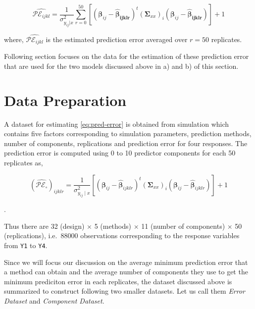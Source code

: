 \documentclass[12pt,3p,authoryear]{elsarticle}
\begin{document}
\begin{equation}
\widehat{\mathcal{PE}_{ijkl}} = \frac{1}{\sigma_{y_{ij}|x}^2}
  \sum_{r=0}^{50}{\left[\left(\boldsymbol{\beta}_{ij} - 
  \boldsymbol{\hat{\beta}_{ijklr}}\right)^t
  \left(\boldsymbol{\Sigma}_{xx}\right)_i
  \left(\boldsymbol{\beta}_{ij} - \boldsymbol{\hat{\beta}_{ijklr}}\right)\right]} + 1
\label{eq:estimated-pred-error}
\end{equation}

where, \(\widehat{\mathcal{PE}_{ijkl}}\) is the estimated prediction
error averaged over \(r=50\) replicates.

Following section focuses on the data for the estimation of these
prediction error that are used for the two models discussed above in a)
and b) of this section.

\section{Data Preparation}\label{data-preparation}

A dataset for estimating \eqref{eq:pred-error} is obtained from simulation
which contains five factors corresponding to simulation parameters,
prediction methods, number of components, replications and prediction
error for four responses. The prediction error is computed using 0 to 10
predictor components for each 50 replicates as,

\begin{equation*}
\left(\widehat{\mathcal{PE_\circ}}\right)_{ijklr} =
  \frac{1}{\sigma_{y_{ij}\mid x}^2}\left[
    \left(\boldsymbol{\beta}_{ij} - \hat{\boldsymbol{\beta}}_{ijklr}\right)^t
    \left(\boldsymbol{\Sigma}_{xx}\right)_{i}
    \left(\boldsymbol{\beta}_{ij} - \hat{\boldsymbol{\beta}}_{ijklr}\right)
  \right] + 1
\end{equation*}

.

Thus there are 32 (design) \(\times\) 5 (methods) \(\times\) 11 (number
of components) \(\times\) 50 (replications), i.e.~88000 observations
corresponding to the response variables from \texttt{Y1} to \texttt{Y4}.

Since we will focus our discussion on the average minimum prediction
error that a method can obtain and the average number of components they
use to get the minimum prediciton error in each replicates, the dataset
discussed above is summarized to construct following two smaller
datasets. Let us call them \emph{Error Dataset} and \emph{Component
Dataset}.
\end{document}
